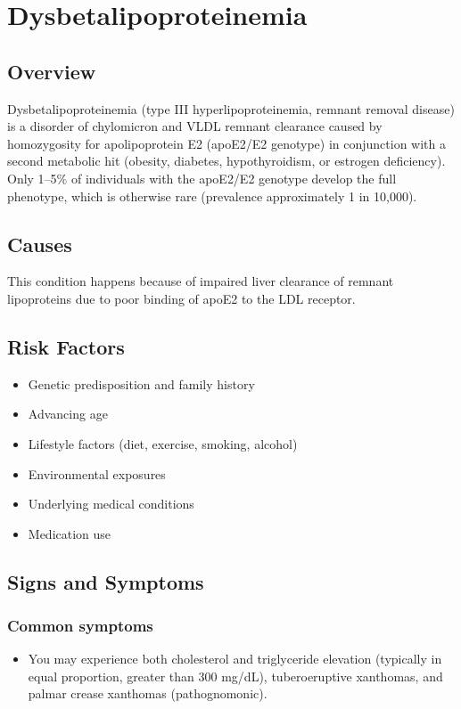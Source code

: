 \chapter{Dysbetalipoproteinemia}
\label{sec:Dysbetalipoproteinemia}

\section{Overview}
Dysbetalipoproteinemia (type III hyperlipoproteinemia, remnant removal disease) is a disorder of chylomicron and VLDL remnant clearance caused by homozygosity for apolipoprotein E2 (apoE2/E2 genotype) in conjunction with a second metabolic hit (obesity, diabetes, hypothyroidism, or estrogen deficiency). Only 1--5\% of individuals with the apoE2/E2 genotype develop the full phenotype, which is otherwise rare (prevalence approximately 1 in 10,000).
\section{Causes}
This condition happens because of impaired liver clearance of remnant lipoproteins due to poor binding of apoE2 to the LDL receptor.     
\section{Risk Factors}

\begin{itemize}[noitemsep]
  \item Genetic predisposition and family history
  \item Advancing age
  \item Lifestyle factors (diet, exercise, smoking, alcohol)
  \item Environmental exposures
  \item Underlying medical conditions
  \item Medication use
\end{itemize}
\section{Signs and Symptoms}

\subsection{Common symptoms}
\begin{itemize}[noitemsep]
  \item You may experience both cholesterol and triglyceride elevation (typically in equal proportion, greater than 300 mg/dL), tuberoeruptive xanthomas, and palmar crease xanthomas (pathognomonic). 
  \end{itemize}

